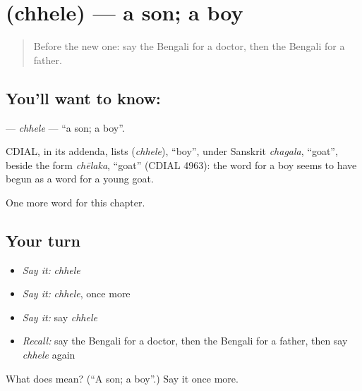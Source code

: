 \section[\texorpdfstring{\bn{ছেলে} (chhele)}{ছেলে (chhele)}]{ (chhele) — a son; a boy}

\label{lesson:BN-C45-chhele}



\begin{quote}
Before the new one: say the Bengali for a doctor, then the Bengali for a father.
\end{quote}

\subsection*{You'll want to know: }
\textbf{} — \emph{chhele} — \textquotedblleft{}a son; a boy\textquotedblright{}.

\begin{cousinweb}
CDIAL, in its addenda, lists \textbf{} (\emph{chhele}), \textquotedblleft{}boy\textquotedblright{}, under Sanskrit \emph{chagala}, \textquotedblleft{}goat\textquotedblright{}, beside the form \emph{chēlaka}, \textquotedblleft{}goat\textquotedblright{} (CDIAL 4963): the word for a boy seems to have begun as a word for a young goat.
\end{cousinweb}

\begin{grammarlens}[title={What you've built}]
One more word for this chapter.
\end{grammarlens}

\subsection*{Your turn}
\begin{itemize}
\raggedright
  \item \emph{Say it:} \emph{chhele}
  \item \emph{Say it:} \emph{chhele}, once more
  \item \emph{Say it:} say \emph{chhele}
  \item \emph{Recall:} say the Bengali for a doctor, then the Bengali for a father, then say \emph{chhele} again
\end{itemize}

\begin{tcolorbox}[breakable,colback=teal!4,colframe=teal!35!black,title={Before you move on}]
What does  mean? (\textquotedblleft{}A son; a boy\textquotedblright{}.) Say it once more.
\end{tcolorbox}
